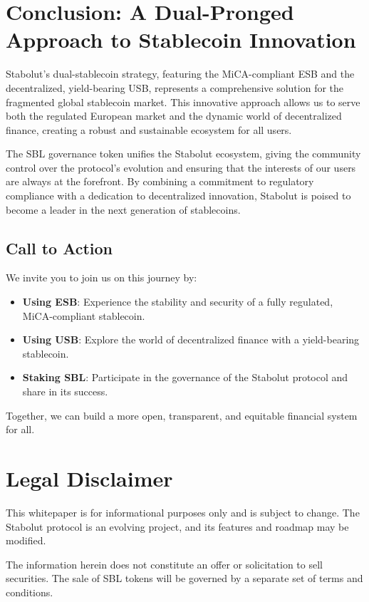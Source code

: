 \section{Conclusion: A Dual-Pronged Approach to Stablecoin Innovation}
Stabolut's dual-stablecoin strategy, featuring the MiCA-compliant ESB and the decentralized, yield-bearing USB, represents a comprehensive solution for the fragmented global stablecoin market. This innovative approach allows us to serve both the regulated European market and the dynamic world of decentralized finance, creating a robust and sustainable ecosystem for all users.

The SBL governance token unifies the Stabolut ecosystem, giving the community control over the protocol's evolution and ensuring that the interests of our users are always at the forefront. By combining a commitment to regulatory compliance with a dedication to decentralized innovation, Stabolut is poised to become a leader in the next generation of stablecoins.

\subsection{Call to Action}
We invite you to join us on this journey by:
\begin{itemize}
    \item \textbf{Using ESB}: Experience the stability and security of a fully regulated, MiCA-compliant stablecoin.
    \item \textbf{Using USB}: Explore the world of decentralized finance with a yield-bearing stablecoin.
    \item \textbf{Staking SBL}: Participate in the governance of the Stabolut protocol and share in its success.
\end{itemize}

Together, we can build a more open, transparent, and equitable financial system for all.

\section{Legal Disclaimer}
This whitepaper is for informational purposes only and is subject to change. The Stabolut protocol is an evolving project, and its features and roadmap may be modified.

The information herein does not constitute an offer or solicitation to sell securities. The sale of SBL tokens will be governed by a separate set of terms and conditions.

